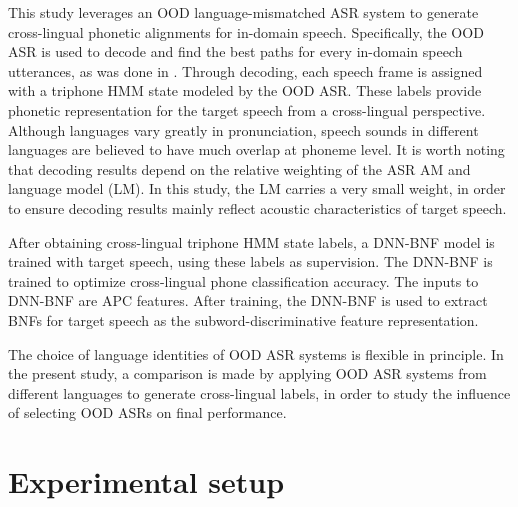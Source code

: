 \documentclass[a4paper]{article}
\begin{document}
This study leverages an OOD language-mismatched ASR system to generate cross-lingual phonetic alignments for in-domain speech.
Specifically, the OOD ASR is used to decode  and find the best paths for every in-domain speech utterances, as was done in \cite{feng2019_TASLP}. Through decoding, each speech frame is assigned with a triphone HMM state modeled by the OOD ASR. These labels provide phonetic representation for the target speech from a cross-lingual perspective. Although languages vary greatly in pronunciation, speech sounds in different languages are believed to have much overlap at phoneme level.
It is worth noting that decoding results depend on the relative weighting  of the ASR AM and language model (LM). In this study, the LM carries a very small weight, in order to ensure decoding results mainly reflect acoustic characteristics of target speech.

After obtaining cross-lingual triphone HMM state labels, a DNN-BNF model is trained with target speech, using these labels as supervision.  
The DNN-BNF is trained to optimize cross-lingual phone classification accuracy.
The inputs to DNN-BNF are APC features. 
After training, the DNN-BNF is used to extract BNFs for target speech as the subword-discriminative feature representation. 

The choice of language identities of OOD ASR systems is flexible in principle. In the present study, a comparison is made by applying OOD ASR systems from different languages to generate cross-lingual labels, in order to study the influence of selecting OOD ASRs on final performance.


\section{Experimental setup}
\end{document}
